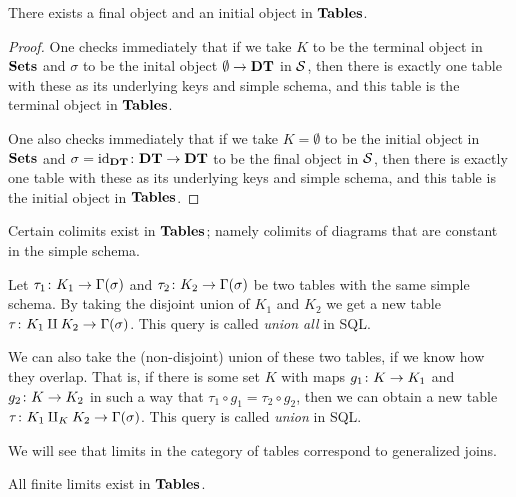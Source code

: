 \documentclass{amsart}
\def\DT{{\bf DT}}
\def\Tables{{\bf Tables}}
\begin{document}
\begin{lemma}\label{final object}

There exists a final object and an initial object in $\Tables$.    

\end{lemma}

\begin{proof}

One checks immediately that if we take $K$ to be the terminal object in ${\bf Sets}$ and $\sigma$ to be the inital object $\emptyset\to\DT$ in $\mathcal{S}$, then there is exactly one table with these as its underlying keys and simple schema, and this table is the terminal object in $\Tables$.

One also checks immediately that if we take $K=\emptyset$ to be the initial object in ${\bf Sets}$ and $\sigma=\id_{\DT}\taking\DT\to\DT$ to be the final object in $\mathcal{S}$, then there is exactly one table with these as its underlying keys and simple schema, and this table is the initial object in $\Tables$.

\end{proof}

Certain colimits exist in $\Tables$; namely colimits of diagrams that are constant in the simple schema.

\begin{construction}

Let $\tau_1\colon K_1\rightarrow\Gamma(\sigma)$ and $\tau_2\colon K_2\rightarrow\Gamma(\sigma)$ be two tables with the same simple schema.  By taking the disjoint union of $K_1$ and $K_2$ we get a new table $\tau\colon K_1\amalg K_2\rightarrow\Gamma(\sigma)$.  This query is called {\em union all} in SQL.  

We can also take the (non-disjoint) union of these two tables, if we know how they overlap.  That is, if there is some set $K$ with maps $g_1\colon K\rightarrow K_1$ and $g_2\colon K\rightarrow K_2$ in such a way that $\tau_1\circ g_1=\tau_2\circ g_2$, then we can obtain a new table $\tau\colon K_1\amalg_KK_2\rightarrow\Gamma(\sigma)$.  This query is called {\em union} in SQL.

\end{construction}

We will see that limits in the category of tables correspond to generalized joins.

\begin{proposition}\label{finite limits exist}

All finite limits exist in $\Tables$.

\end{proposition}
\end{document}
